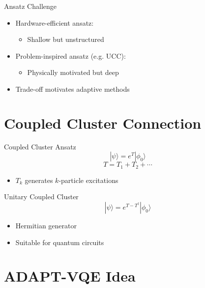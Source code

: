 \documentclass{beamer}
\begin{document}

\begin{frame}{Ansatz Challenge}
\begin{itemize}
\item Hardware-efficient ansatz:
\begin{itemize}
\item Shallow but unstructured
\end{itemize}
\item Problem-inspired ansatz (e.g. UCC):
\begin{itemize}
\item Physically motivated but deep
\end{itemize}
\item Trade-off motivates adaptive methods
\end{itemize}
\end{frame}

\section{Coupled Cluster Connection}

\begin{frame}{Coupled Cluster Ansatz}
\[
|\psi\rangle = e^{T} |\phi_0\rangle
\]
\[
T = T_1 + T_2 + \cdots
\]
\begin{itemize}
\item $T_k$ generates $k$-particle excitations
\end{itemize}
\end{frame}


\begin{frame}{Unitary Coupled Cluster}
\[
|\psi\rangle = e^{T - T^\dagger} |\phi_0\rangle
\]
\begin{itemize}
\item Hermitian generator
\item Suitable for quantum circuits
\end{itemize}
\end{frame}

\section{ADAPT-VQE Idea}
\end{document}
